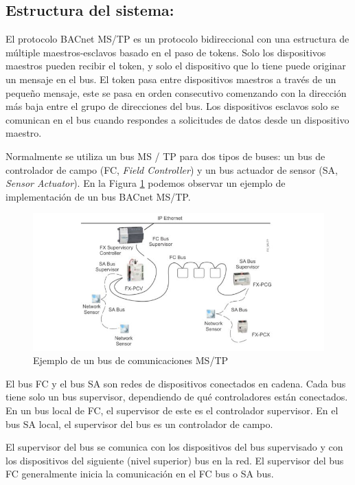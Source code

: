 \subsection{Estructura del sistema:}
El protocolo BACnet MS/TP es un protocolo bidireccional con una estructura de múltiple maestros-esclavos basado en el paso de tokens. Solo los dispositivos maestros pueden recibir el token, y solo el dispositivo que lo tiene puede originar un mensaje en el bus. El token pasa entre dispositivos maestros a través de un pequeño mensaje, este se pasa en orden consecutivo comenzando con la dirección más baja entre el grupo de direcciones del bus. Los dispositivos esclavos solo se comunican en el bus cuando respondes a solicitudes de datos desde un dispositivo maestro. 

Normalmente se utiliza un bus MS / TP para dos tipos de buses: un bus de controlador de campo (FC, \textit{Field Controller}) y un bus actuador de sensor (SA, \textit{Sensor Actuator}). En la Figura \ref{fig:BACnet_MSTP} podemos observar un ejemplo de implementación de un bus BACnet MS/TP.

\begin{figure}[H]
    \centering
    \includegraphics[width=1\textwidth]{2_MainMatter/Capitulo1/Imagenes/BACnet_MSTP_Johnson.JPG}
    \caption{Ejemplo de un bus de comunicaciones MS/TP\cite{MSTP}}
    \label{fig:BACnet_MSTP}
\end{figure}

El bus FC y el bus SA son redes de dispositivos conectados en cadena. Cada bus tiene solo un bus supervisor, dependiendo de qué controladores están conectados. En un bus local de FC, el supervisor de este es el controlador supervisor. En el bus SA local, el supervisor del bus es un controlador de campo.

El supervisor del bus se comunica con los dispositivos del bus supervisado y con los dispositivos del siguiente (nivel superior) bus en la red. El supervisor del bus FC generalmente inicia la comunicación en el FC bus o SA bus.

